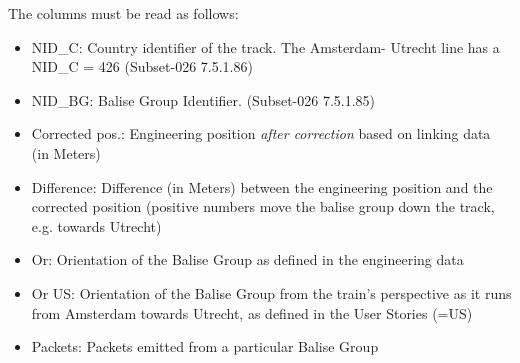 \documentclass{template/openetcs_article}
\begin{document}
The columns must be read as follows:
\begin{itemize}
 \item NID\_C: Country identifier of the track. The Amsterdam- Utrecht line has a NID\_C = 426 (Subset-026 7.5.1.86)\cite{SRS026-7}
 \item NID\_BG: Balise Group Identifier. (Subset-026 7.5.1.85)\cite{SRS026-7}
 \item Corrected pos.: Engineering position \emph{after correction} based on linking data (in Meters)
 \item Difference: Difference (in Meters) between the engineering position and the corrected position (positive numbers move the balise group down the track, e.g. towards Utrecht)
 \item Or: Orientation of the Balise Group as defined in the engineering data
 \item Or US: Orientation of the Balise Group from the train's perspective as it runs from Amsterdam towards Utrecht, as defined in the User Stories (=US)
 \item Packets: Packets emitted from a particular Balise Group 
\end{itemize}
\end{document}
